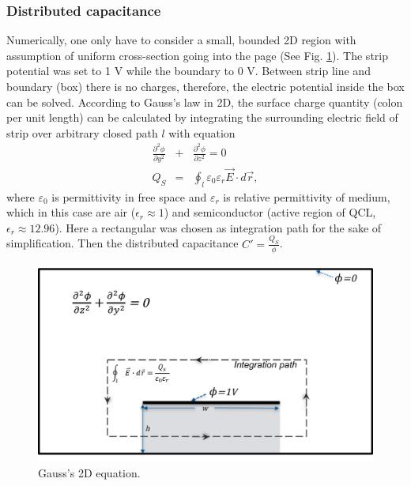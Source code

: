 \documentclass[11pt,final]{scrbook}
\begin{document}
\subsubsection{Distributed capacitance}
Numerically, one only have to consider a small, bounded 2D region with assumption of uniform cross-section going into the page (See Fig. \ref{fig:Gauss2D}). The strip potential was set to 1 V while the boundary to 0 V.  Between strip line and boundary (box) there is no charges, therefore, the electric potential inside the box can be solved. According to Gauss's law in 2D, the surface charge quantity (colon per unit length) can be calculated by integrating the surrounding electric field of strip over arbitrary closed path $l$ with equation
\begin{eqnarray}
\frac { { \partial  }^{ 2 }\phi  }{ \partial { y }^{ 2 } } &+&\frac { { \partial  }^{ 2 }\phi  }{ \partial { z }^{ 2 } } =0 \label{Eqn:TL_C(2)}\\
{ Q }_{ S }&=&\oint _{ l }{\varepsilon_{0}\varepsilon_{r}\overrightarrow { E } \cdot d\overrightarrow { r } },
\end{eqnarray}
where $\varepsilon_{0}$ is permittivity in free space and $\varepsilon_{r}$ is relative permittivity of medium, which in this case are air ($\epsilon_{r}\approx 1$) and semiconductor (active region of QCL, $\epsilon_{r}\approx 12.96$). Here a rectangular was chosen as integration path for the sake of simplification. Then the distributed capacitance $C'=\frac{Q_{S}}{\phi}$.

\begin{figure}[htbp]
\begin{center}
\includegraphics[scale=0.5]{images/Gauss2D.pdf}
\caption{Gauss's 2D equation.}
\label{fig:Gauss2D}
\end{center}
\end{figure}
\end{document}
